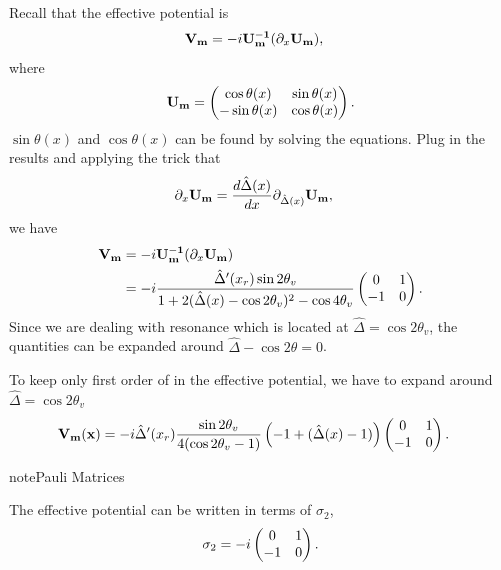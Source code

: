\documentclass[letterpaper,12pt,english]{sphinxmanual}
\begin{document}
Recall that the effective potential is
\begin{gather}
\begin{split}\mathbf{V_m} & = -i\mathbf{U_m^{-1}} ( \partial_x \mathbf{U_m} ) ,\end{split}\notag
\end{gather}
where
\begin{gather}
\begin{split}\mathbf{U_m} = \begin{pmatrix} \cos \theta(x) & \sin\theta(x) \\ -\sin\theta(x) & \cos\theta(x) \end{pmatrix} .\end{split}\notag
\end{gather}
\(\sin\theta(x)\) and \(\cos\theta(x)\) can be found by solving the equations. Plug in the results and applying the trick that
\begin{gather}
\begin{split}\partial_x \mathbf{U_m} & = \frac{d \hat\Delta(x)}{dx} \partial_{ \hat\Delta(x)} \mathbf{U_m} ,\end{split}\notag
\end{gather}
we have
\begin{gather}
\begin{split}\mathbf{V_m} & = -i\mathbf{U_m^{-1}} ( \partial_x \mathbf{U_m} ) \\
& = - i \frac{\hat\Delta'(x_r) \sin 2\theta_v}{ 1 + 2 (\hat\Delta(x)-\cos 2\theta_v)^2 - \cos 4\theta_v }   \begin{pmatrix}
0 & 1 \\
-1 & 0
\end{pmatrix} .\end{split}\notag
\end{gather}
Since we are dealing with resonance which is located at \(\hat\Delta =\cos 2\theta_v\), the quantities can be expanded around \(\hat\Delta - \cos 2\theta = 0\).

To keep only first order of in the effective potential, we have to expand around \(\hat\Delta = \cos 2\theta_v\)
\begin{gather}
\begin{split}\mathbf{V_m(x)} & = - i \hat\Delta'(x_r) \frac{\sin 2\theta_v}{4(\cos 2\theta_v -1)} \left( -1 + (\hat\Delta(x) - 1)  \right)  \begin{pmatrix}
0 & 1 \\
-1 & 0
\end{pmatrix}.\end{split}\notag
\end{gather}
\begin{notice}{note}{Pauli Matrices}

The effective potential can be written in terms of \(\sigma_2\),
\begin{gather}
\begin{split}\sigma_2 = - i  \begin{pmatrix}
0 & 1 \\
-1 & 0
\end{pmatrix}.\end{split}\notag
\end{gather}\end{notice}
\end{document}
